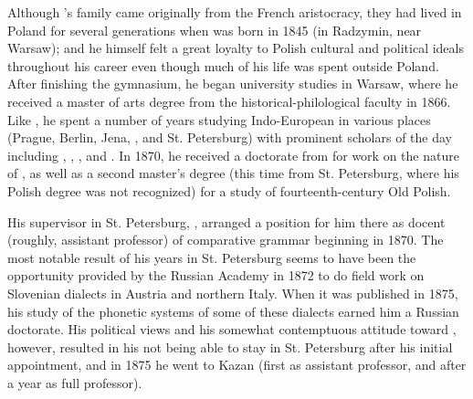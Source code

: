 Although {\Baudouin}'s family came originally from the {French}
aristocracy, they had lived in Poland for several generations when
{\Baudouin} was born in 1845 (in Radzymin, near Warsaw); and he himself
felt a great loyalty to Polish cultural and political ideals
throughout his career even though much of his life was spent outside
Poland. After finishing the gymnasium, he began university studies in
Warsaw, where he received a master of arts degree from the
historical-philological faculty in 1866. Like {\Saussure}, he spent a
number of years studying {Indo-European} in various places (Prague,
Berlin, Jena, , and St. Petersburg) with prominent scholars of
the day including {\Schleicher}, {\Leskien}, {\Brugmann}, and {\Delbruck}. In
1870, he received a doctorate from  for work on the nature of
, as well as a second master's degree (this time from
St. Petersburg, where his Polish degree was not recognized) for a
study of fourteenth-century Old Polish.

His supervisor in St. Petersburg, , arranged a
position for him there as docent (roughly, assistant professor) of
comparative grammar beginning in 1870. The most notable result of his
years in St. Petersburg seems to have been the opportunity provided by
the {Russian} Academy in 1872 to do field work on Slovenian dialects in
Austria and northern Italy. When it was published in 1875, his study
of the phonetic systems of some of these dialects earned him a {Russian}
doctorate. His political views and his somewhat contemptuous attitude
toward {\Sreznevskij}, however, resulted in his not being able to stay in
St. Petersburg after his initial appointment, and in 1875 he went to
Kazan (first as assistant professor, and after a year as full
professor).

